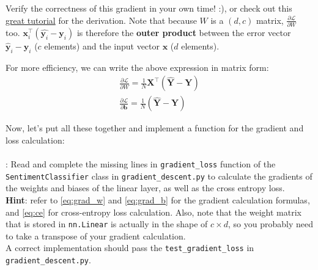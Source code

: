 Verify the correctness of this gradient in your own time! :), or check out this \href{https://jmlb.github.io/ml/2017/12/26/Calculate_Gradient_Softmax/}{great tutorial} for the derivation. Note that because $W$ is a $(d, c)$ matrix, $\frac{\partial \mathcal{L} }{\partial W}$ too. $\mathbf{x}_i^\top(\hat{\mathbf{y}_i} - \mathbf{y}_i)$ is therefore the \textbf{outer product} between the error vector $\hat{\mathbf{y}}_i - \mathbf{y}_i$ ($c$ elements) and the input vector $\mathbf{x}$ ($d$ elements).

For more efficiency, we can write the above expression in matrix form:
\begin{align}
    \frac{\partial \mathcal{L} }{\partial W} = \frac{1}{N}  \mathbf{X}^\top (\hat{\mathbf{Y}} -\mathbf{Y})\label{eq:grad_w} \\
    \frac{\partial \mathcal{L} }{\partial \mathbf{b}} = \frac{1}{N}  (\hat{\mathbf{Y}} -\mathbf{Y})\label{eq:grad_b}
\end{align}
  
Now, let's put all these together and implement a function for the gradient and loss calculation:\\\\
\noindent \todo{}: Read and complete the missing lines in \texttt{gradient\_loss} function of the \texttt{SentimentClassifier} class in \texttt{gradient\_descent.py} to calculate the gradients of the weights and biases of the linear layer, as well as the cross entropy loss.
\\
\noindent \textbf{Hint}: refer to \autoref{eq:grad_w} and \autoref{eq:grad_b} for the gradient calculation formulas, and \autoref{eq:ce} for cross-entropy loss calculation. Also, note that the weight matrix that is stored in \texttt{nn.Linear} is actually in the shape of $c \times d$, so you probably need to take a transpose of your gradient calculation.
\\
A correct implementation should pass the \texttt{test\_gradient\_loss} in \texttt{gradient\_descent.py}.

